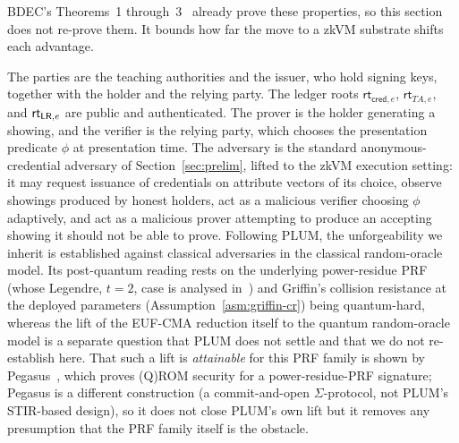 BDEC's Theorems~1 through~3~\cite{10.1007/978-981-96-0957-4_3} already prove these properties, so this section does not re-prove them. It bounds how far the move to a zkVM substrate shifts each advantage. 

The parties are the teaching authorities and the issuer, who hold signing keys, together with the holder and the relying party. The ledger roots $\mathsf{rt}_{\mathsf{cred},e}$, $\mathsf{rt}_{TA,e}$, and $\mathsf{rt}_{\mathsf{LR},e}$ are public and authenticated. The prover is the holder generating a showing, and the verifier is the relying party, which chooses the presentation predicate $\phi$ at presentation time. The adversary is the standard anonymous-credential adversary of Section~\ref{sec:prelim}, lifted to the zkVM execution setting: it may request issuance of credentials on attribute vectors of its choice, observe showings produced by honest holders, act as a malicious verifier choosing $\phi$ adaptively, and act as a malicious prover attempting to produce an accepting showing it should not be able to prove. Following PLUM, the unforgeability we inherit is established against classical adversaries in the classical random-oracle model. Its post-quantum reading rests on the underlying power-residue PRF (whose Legendre, $t{=}2$, case is analysed in~\cite{frixons2021quantum}) and Griffin's collision resistance at the deployed parameters (Assumption~\ref{asm:griffin-cr}) being quantum-hard, whereas the lift of the EUF-CMA reduction itself to the quantum random-oracle model is a separate question that PLUM does not settle and that we do not re-establish here. That such a lift is \emph{attainable} for this PRF family is shown by Pegasus~\cite{cryptoeprint:2025/1841}, which proves {(Q)ROM} security for a power-residue-PRF signature; Pegasus is a different construction (a commit-and-open $\Sigma$-protocol, not PLUM's STIR-based design), so it does not close PLUM's own lift but it removes any presumption that the PRF family itself is the obstacle.

%

